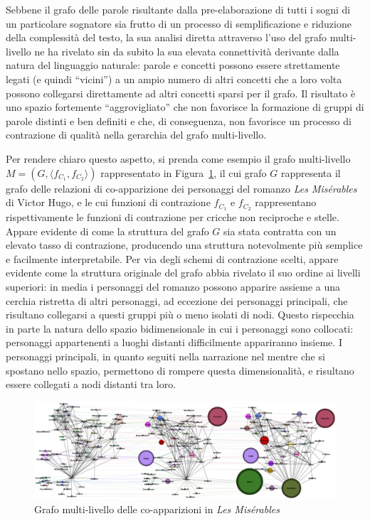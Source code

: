 
Sebbene il grafo delle parole risultante dalla pre-elaborazione di tutti i sogni di un particolare sognatore
sia frutto di un processo di semplificazione e riduzione della complessità del testo, la sua analisi diretta
attraverso l'uso del grafo multi-livello ne ha rivelato sin da subito la sua elevata connettività derivante dalla
natura del linguaggio naturale: parole e concetti possono essere strettamente legati (e quindi ``vicini'') a un
ampio numero di altri concetti che a loro volta possono collegarsi direttamente ad altri concetti sparsi per il grafo.
Il risultato è uno spazio fortemente ``aggrovigliato'' che non favorisce la formazione di gruppi di parole distinti e
ben definiti e che, di conseguenza, non favorisce un processo di contrazione di qualità nella
gerarchia del grafo multi-livello.

Per rendere chiaro questo aspetto, si prenda come esempio il grafo multi-livello $M = (G, \langle f_{C_1}, f_{C_2}\rangle)$
rappresentato in Figura~\ref{fig:les-miserables-graph}, il cui grafo $G$ rappresenta il grafo delle relazioni di
co-apparizione dei personaggi del romanzo \textit{Les Misérables} di Victor Hugo,
e le cui funzioni di contrazione $f_{C_1}$ e $f_{C_2}$ rappresentano rispettivamente le funzioni di contrazione
per cricche non reciproche e stelle.
Appare evidente di come la struttura del grafo $G$ sia stata contratta con un elevato tasso di contrazione,
producendo una struttura notevolmente più semplice e facilmente interpretabile. Per via degli schemi di
contrazione scelti, appare evidente come la struttura originale del grafo abbia rivelato il suo ordine ai livelli
superiori: in media i personaggi del romanzo possono apparire assieme a una cerchia ristretta di altri personaggi,
ad eccezione dei personaggi principali, che risultano collegarsi a questi gruppi più o meno isolati di nodi.
Questo rispecchia in parte la natura dello spazio bidimensionale in cui i personaggi sono collocati: personaggi
appartenenti a luoghi distanti difficilmente appariranno insieme. I personaggi principali, in quanto seguiti
nella narrazione nel mentre che si spostano nello spazio, permettono di rompere questa dimensionalità, e risultano
essere collegati a nodi distanti tra loro.

\begin{figure}[h]
    \centering
    \includegraphics[width=1\textwidth]{Immagini/les_miserables_example}
    \caption{Grafo multi-livello delle co-apparizioni in \textit{Les Misérables}}
    \label{fig:les-miserables-graph}
\end{figure}


